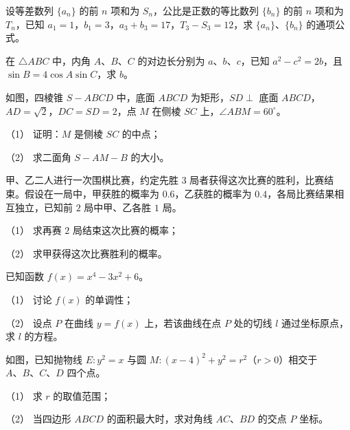 \begin{question}
设等差数列 $\{a_n\}$ 的前 $n$ 项和为 $S_n$，公比是正数的等比数列 $\{b_n\}$ 的前 $n$ 项和为 $T_n$，已知 $a_1=1$，$b_1=3$，$a_3+b_3=17$，$T_3-S_3=12$，求 $\{a_n\}$、$\{b_n\}$ 的通项公式。

\end{question}
\begin{question}
在 $\triangle ABC$ 中，内角 $A\text{、}B\text{、}C$ 的对边长分别为 $a\text{、}b\text{、}c$，已知 $a^2-c^2=2b$，且 $\sin B=4\cos A\sin C$，求 $b$。

\Needspace{0.4\textheight}
\end{question}
\begin{question}
如图，四棱锥 $S-ABCD$ 中，底面 $ABCD$ 为矩形，$SD\perp$ 底面 $ABCD$，$AD=\sqrt2$，$DC=SD=2$，点 $M$ 在侧棱 $SC$ 上，$\angle ABM=60^\circ$。
\nopagebreak[4]
\begin{center}\end{center}
\nopagebreak[4]
（1） 证明：$M$ 是侧棱 $SC$ 的中点；

（2） 求二面角 $S-AM-B$ 的大小。

\end{question}
\begin{question}
甲、乙二人进行一次围棋比赛，约定先胜 $3$ 局者获得这次比赛的胜利，比赛结束。假设在一局中，甲获胜的概率为 $0.6$，乙获胜的概率为 $0.4$，各局比赛结果相互独立，已知前 $2$ 局中甲、乙各胜 $1$ 局。

（1） 求再赛 $2$ 局结束这次比赛的概率；

（2） 求甲获得这次比赛胜利的概率。

\end{question}
\begin{question}
已知函数 $f(x)=x^4-3x^2+6$。

（1） 讨论 $f(x)$ 的单调性；

（2） 设点 $P$ 在曲线 $y=f(x)$ 上，若该曲线在点 $P$ 处的切线 $l$ 通过坐标原点，求 $l$ 的方程。

\Needspace{0.4\textheight}
\end{question}
\begin{question}
如图，已知抛物线 $E:y^2=x$ 与圆 $M:(x-4)^2+y^2=r^2$（$r>0$）相交于 $A\text{、}B\text{、}C\text{、}D$ 四个点。
\nopagebreak[4]
\begin{center}\end{center}
\nopagebreak[4]
（1） 求 $r$ 的取值范围；

（2） 当四边形 $ABCD$ 的面积最大时，求对角线 $AC\text{、}BD$ 的交点 $P$ 坐标。

\end{question}